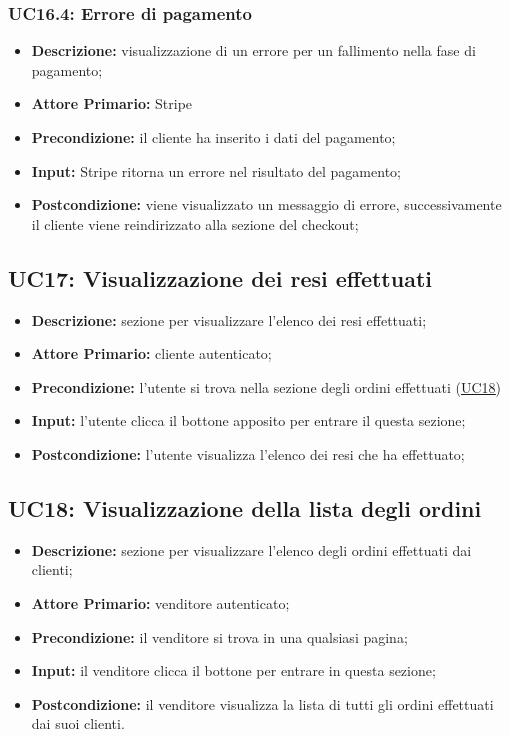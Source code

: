             \subsubsection{UC16.4: Errore di pagamento}
            \label{sec:UC16.4}
                \begin{itemize}
                    \item \textbf{Descrizione:} visualizzazione di un errore per un fallimento nella fase di pagamento;
                    \item \textbf{Attore Primario:} Stripe
                    \item \textbf{Precondizione:} il cliente ha inserito i dati del pagamento;
                    \item \textbf{Input:} Stripe ritorna un errore nel risultato del pagamento;
                    \item \textbf{Postcondizione:} viene visualizzato un messaggio di errore, successivamente il cliente viene reindirizzato alla sezione del checkout;
                \end{itemize}


        \subsection{UC17: Visualizzazione dei resi effettuati}
            \begin{itemize}
                \item \textbf{Descrizione:} sezione per visualizzare l'elenco dei resi effettuati;
                \item \textbf{Attore Primario:} cliente autenticato;
                \item \textbf{Precondizione:} l'utente si trova nella sezione degli ordini effettuati (\hyperref[sec:UC18]{\underline{UC18}})
                \item \textbf{Input:} l'utente clicca il bottone apposito per entrare il questa sezione;
                \item \textbf{Postcondizione:} l'utente visualizza l'elenco dei resi che ha effettuato;
            \end{itemize}


        \subsection{UC18: Visualizzazione della lista degli ordini}
        \label{sec:UC18}
        \begin{itemize}
            \item \textbf{Descrizione:} sezione per visualizzare l'elenco degli ordini effettuati dai clienti;
            \item \textbf{Attore Primario:} venditore autenticato; 
            \item \textbf{Precondizione:} il venditore si trova in una qualsiasi pagina;
            \item \textbf{Input:} il venditore clicca il bottone per entrare in questa sezione; 
            \item \textbf{Postcondizione:} il venditore visualizza la lista di tutti gli ordini effettuati dai suoi clienti.
        \end{itemize}


